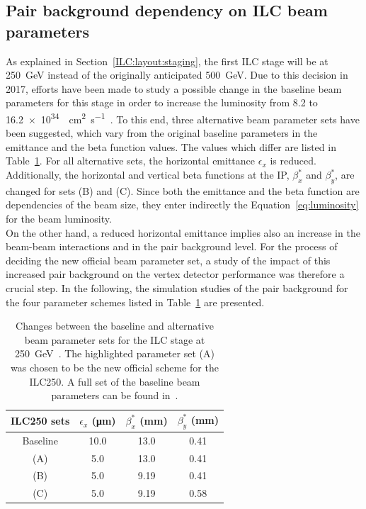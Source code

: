 \subsection{Pair background dependency on ILC beam parameters}
As explained in Section~\ref{ILC:layout:staging}, the first ILC stage will be at \SI{250}{\GeV} instead of the originally anticipated \SI{500}{\GeV}.
Due to this decision in 2017, efforts have been made to study a possible change in the baseline beam parameters for this stage in order to increase the luminosity from \num{8.2} to \SI{16.2e34}{\per\centi\meter\squared\per\second}~\cite{LCWS17_paper}. 
To this end, three alternative beam parameter sets have been suggested, which vary from the original baseline parameters in the emittance and the beta function values.
The values which differ are listed in Table~\ref{tab:ILC250_sets}.
For all alternative sets, the horizontal emittance $\epsilon_x$ is reduced. 
Additionally, the horizontal and vertical beta functions at the IP, $\beta^*_x$ and $\beta^*_y$, are changed for sets (B) and (C).
Since both the emittance and the beta function are dependencies of the beam size, they enter indirectly the Equation~\ref{eq:luminosity} for the beam luminosity.
\\On the other hand, a reduced horizontal emittance implies also an increase in the beam-beam interactions and in the pair background level.
For the process of deciding the new official beam parameter set, a study of the impact of this increased pair background on the \sid vertex detector performance was therefore a crucial step.
In the following, the simulation studies of the pair background for the four parameter schemes listed in Table~\ref{tab:ILC250_sets} are presented.
\begin{table}
\caption[New ILC250 beam parameters]{Changes between the baseline and alternative beam parameter sets for the ILC stage at \SI[detect-all]{250}{\GeV}~\cite{LCWS17_paper}.
The highlighted parameter set (A) was chosen to be the new official scheme for the ILC250.
A full set of the baseline beam parameters can be found in~\cite[p. 11]{TDR1}.}
\label{tab:ILC250_sets}
\centering
\begin{tabularx}{0.48\textwidth}{c|ccc}
\hline\hline
\textbf{ILC250 sets} & $\epsilon_x$ (\si{\micro\meter}) & $\beta^*_x$ (\si{\milli\meter}) & $\beta^*_y$ (\si{\milli\meter})\\
\hline
 Baseline & 10.0 & 13.0 & 0.41\\
\rowcolor{Gray} (A) & 5.0 & 13.0 & 0.41\\
 (B) & 5.0 & 9.19 & 0.41\\
 (C) & 5.0 & 9.19 & 0.58\\
\hline\hline
\end{tabularx}
\end{table}

